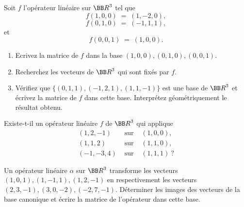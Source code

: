 \documentclass[12pt,french,oneside,a4paper]{memoir} %
\begin{document}
\begin{exo}
Soit $f$ l'opérateur linéaire sur ${\BB R}^3$ tel que
\begin{equation*}
f(1,0,0) \;=\; (1,-2,0), 
\end{equation*}
\begin{equation*}
f(0,1,0) \;=\; (-1,1,1), 
\end{equation*}
et
\begin{equation*}
f(0,0,1) \;=\; (1,0,0).
\end{equation*}
\begin{enumerate}
\item Ecrivez la matrice de $f$ dans la base $(1,0,0), (0,1,0), (0,0,1)$.
\item Recherchez les vecteurs de ${\BB R}^3$ qui sont fixés par $f$. 
\item Vérifiez que $\{(0,1,1), (-1,2,1), (1,1,-1) \}$ est une 
base de ${\BB R}^3$ et écrivez la matrice de $f$ dans cette base. Interprétez
géométriquement le résultat obtenu. 
\end{enumerate}
\end{exo}
\begin{exo}
Existe-t-il un opérateur linéaire $f$ de ${\BB R}^3$ qui applique 
\begin{equation*}
\begin{array}{rcl}
(1,2,-1) &\mbox{ sur } &(1,0,0), \\
(1,1,2) &\mbox{ sur } &(1,1,0), \\
(-1,-3,4) &\mbox{ sur } &(1,1,1)~?
\end{array}
\end{equation*}
\end{exo}

\begin{exo}
Un opérateur linéaire $\alpha$ sur ${\BB R}^3$ transforme les vecteurs $(1,0,1), (1,-1,1), (1,2,-1)$ en respectivement les vecteurs $(2,3,-1), (3,0,-2), (-2,7,-1)$. Déterminer les images des vecteurs de la base canonique et écrire la matrice de l'opérateur dans cette base.
\end{exo}
\end{document}
